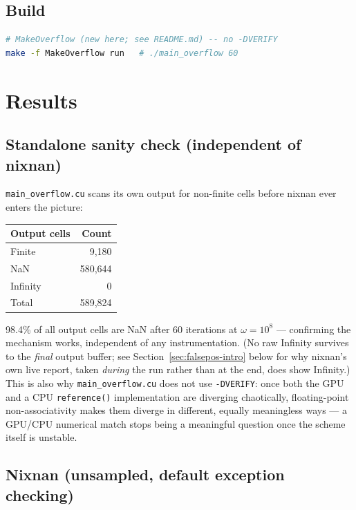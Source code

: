 \documentclass[11pt,a4paper]{article}
\begin{document}
\subsection{Build}

\begin{lstlisting}[language=bash]
# MakeOverflow (new here; see README.md) -- no -DVERIFY
make -f MakeOverflow run   # ./main_overflow 60
\end{lstlisting}

\section{Results}
\label{sec:results}

\subsection{Standalone sanity check (independent of nixnan)}

\texttt{main\_overflow.cu} scans its own output for non-finite cells
before nixnan ever enters the picture:
\begin{center}
\begin{tabular}{lr}
\toprule
Output cells & Count \\
\midrule
Finite & 9{,}180 \\
NaN & 580{,}644 \\
Infinity & 0 \\
\midrule
Total & 589{,}824 \\
\bottomrule
\end{tabular}
\end{center}
98.4\% of all output cells are NaN after 60 iterations at $\omega=10^8$ ---
confirming the mechanism works, independent of any instrumentation. (No
raw Infinity survives to the \emph{final} output buffer; see
Section~\ref{sec:falsepos-intro} below for why nixnan's own live report,
taken \emph{during} the run rather than at the end, does show Infinity.)
This is also why \texttt{main\_overflow.cu} does not use \texttt{-DVERIFY}:
once both the GPU and a CPU \texttt{reference()} implementation are
diverging chaotically, floating-point non-associativity makes them
diverge in different, equally meaningless ways --- a GPU/CPU numerical
match stops being a meaningful question once the scheme itself is
unstable.

\subsection{Nixnan (unsampled, default exception checking)}
\end{document}

